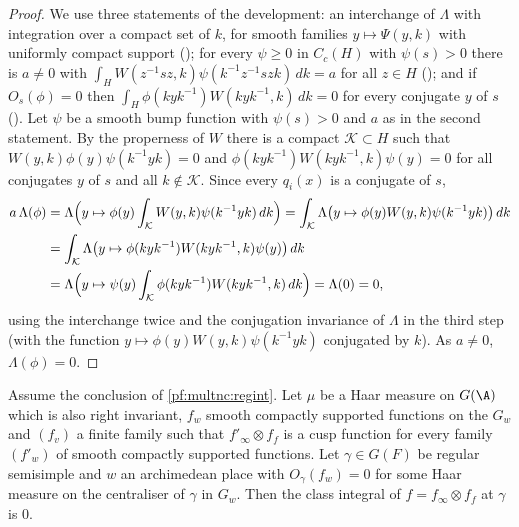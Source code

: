 \begin{proof}
We use three statements of the development: an interchange of $\Lambda$ with integration over a compact set of $k$, for
smooth families $y\mapsto\Psi(y,k)$ with uniformly compact support (); for
every $\psi\ge0$ in $C_c(H)$ with $\psi(s)>0$ there is $a\ne0$ with $\int_HW(z^{-1}sz,k)\psi(k^{-1}z^{-1}szk)\,dk=a$ for all
$z\in H$ (); and if $O_s(\phi)=0$ then $\int_H\phi(kyk^{-1})W(kyk^{-1},k)\,dk=0$
for every conjugate $y$ of $s$ (). Let $\psi$ be a smooth bump function
with $\psi(s)>0$ and $a$ as in the second statement. By the properness of $W$ there is a compact $\mathcal K\subset H$ such
that $W(y,k)\phi(y)\psi(k^{-1}yk)=0$ and $\phi(kyk^{-1})W(kyk^{-1},k)\psi(y)=0$ for all conjugates $y$ of $s$ and all
$k\notin\mathcal K$. Since every $q_i(x)$ is a conjugate of $s$,
\begin{align*}
a\,\Lambda(\phi)&=\Lambda\Bigl(y\mapsto\phi(y)\int_{\mathcal K}W(y,k)\psi(k^{-1}yk)\,dk\Bigr)
=\int_{\mathcal K}\Lambda\bigl(y\mapsto\phi(y)W(y,k)\psi(k^{-1}yk)\bigr)\,dk\\
&=\int_{\mathcal K}\Lambda\bigl(y\mapsto\phi(kyk^{-1})W(kyk^{-1},k)\psi(y)\bigr)\,dk\\
&=\Lambda\Bigl(y\mapsto\psi(y)\int_{\mathcal K}\phi(kyk^{-1})W(kyk^{-1},k)\,dk\Bigr)=\Lambda(0)=0,
\end{align*}
using the interchange twice and the conjugation invariance of $\Lambda$ in the third step (with the function
$y\mapsto\phi(y)W(y,k)\psi(k^{-1}yk)$ conjugated by $k$). As $a\ne0$, $\Lambda(\phi)=0$.
\end{proof}

\begin{lemma}\label{pf:multnc:archzero}
Assume the conclusion of \cref{pf:multnc:regint}. Let $\mu$ be a Haar measure on $G(\A)$ which is also right invariant, $f_w$
smooth compactly supported
functions on the $G_w$ and $(f_v)$ a finite family such that $f'_\infty\otimes f_f$ is a cusp function for every family
$(f'_w)$ of smooth compactly supported functions. Let $\gamma\in G(F)$ be regular semisimple and $w$ an archimedean place
with $O_\gamma(f_w)=0$ for some Haar measure on the centraliser of $\gamma$ in $G_w$. Then the class integral of
$f=f_\infty\otimes f_f$ at $\gamma$ is $0$.
\end{lemma}

